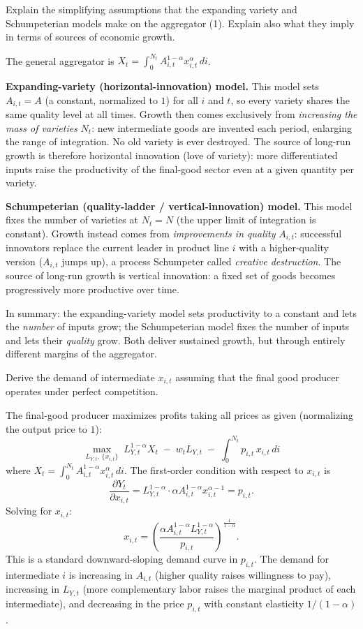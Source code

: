 \documentclass[11pt]{exam}
\begin{document}
\begin{questions}

\question Explain the simplifying assumptions that the expanding variety and Schumpeterian models make on the aggregator (1). Explain also what they imply in terms of sources of economic growth.
\begin{solution}
The general aggregator is $X_{t}=\int_{0}^{N_{t}}A_{i,t}^{1-\alpha}x_{i,t}^{\alpha}\,di$.

\textbf{Expanding-variety (horizontal-innovation) model.} This model sets $A_{i,t}=A$ (a constant, normalized to $1$) for all $i$ and $t$, so every variety shares the same quality level at all times.  Growth then comes exclusively from \emph{increasing the mass of varieties} $N_{t}$: new intermediate goods are invented each period, enlarging the range of integration.  No old variety is ever destroyed.  The source of long-run growth is therefore horizontal innovation (love of variety): more differentiated inputs raise the productivity of the final-good sector even at a given quantity per variety.

\textbf{Schumpeterian (quality-ladder / vertical-innovation) model.} This model fixes the number of varieties at $N_{t}=N$ (the upper limit of integration is constant).  Growth instead comes from \emph{improvements in quality} $A_{i,t}$: successful innovators replace the current leader in product line $i$ with a higher-quality version ($A_{i,t}$ jumps up), a process Schumpeter called \emph{creative destruction}.  The source of long-run growth is vertical innovation: a fixed set of goods becomes progressively more productive over time.

In summary: the expanding-variety model sets productivity to a constant and lets the \emph{number} of inputs grow; the Schumpeterian model fixes the number of inputs and lets their \emph{quality} grow.  Both deliver sustained growth, but through entirely different margins of the aggregator.
\end{solution}

\question Derive the demand of intermediate $x_{i,t}$ assuming that the final good producer operates under perfect competition.
\begin{solution}
The final-good producer maximizes profits taking all prices as given (normalizing the output price to $1$):
\[
	\max_{L_{Y,t},\,\{x_{i,t}\}} \; L_{Y,t}^{1-\alpha}X_{t} \;-\; w_{t}L_{Y,t} \;-\; \int_{0}^{N_{t}}p_{i,t}\,x_{i,t}\,di
\]
where $X_{t}=\int_{0}^{N_{t}}A_{i,t}^{1-\alpha}x_{i,t}^{\alpha}\,di$.  The first-order condition with respect to $x_{i,t}$ is
\[
	\frac{\partial Y_{t}}{\partial x_{i,t}} = L_{Y,t}^{1-\alpha}\cdot \alpha A_{i,t}^{1-\alpha}x_{i,t}^{\alpha-1} = p_{i,t}.
\]
Solving for $x_{i,t}$:
\[
	\boxed{x_{i,t} = \left(\frac{\alpha A_{i,t}^{1-\alpha}L_{Y,t}^{1-\alpha}}{p_{i,t}}\right)^{\!\frac{1}{1-\alpha}}.}
\]
This is a standard downward-sloping demand curve in $p_{i,t}$.  The demand for intermediate $i$ is increasing in $A_{i,t}$ (higher quality raises willingness to pay), increasing in $L_{Y,t}$ (more complementary labor raises the marginal product of each intermediate), and decreasing in the price $p_{i,t}$ with constant elasticity $1/(1-\alpha)$.
\end{solution}


\end{questions}
\end{document}

